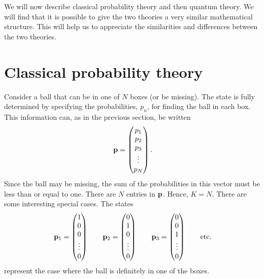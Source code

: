 \documentclass[12pt]{article}
\begin{document}
We will now describe classical probability theory and then quantum
theory.  We will find that it is possible to give the two theories a
very similar mathematical structure.  This will help us to appreciate the
similarities and differences between the two theories.

\section{Classical probability theory}

Consider a ball that can be in one of $N$ boxes (or be missing).  The
state is fully determined by specifying the probabilities, $p_n$, for
finding the ball in each box.  This information can, as in the previous
section, be written
\begin{equation}
  {\bf p} = \left(
  \begin{matrix} p_1 \\ p_2 \\ p_3 \\ \vdots \\ p_N \end{matrix}
  \right).
\end{equation}
Since the ball may be missing, the sum of the probabilities in this
vector must be less than or equal to one.  There are $N$ entries in
${\bf p}$. Hence, $K=N$.  There are some interesting special cases.  The
states
\begin{equation}
{\bf p}_1= \left(
\begin{matrix} 1 \\ 0 \\ 0 \\ \vdots \\ 0 \end{matrix} \right) \qquad
{\bf p}_2= \left(
\begin{matrix} 0 \\ 1 \\ 0 \\ \vdots \\ 0 \end{matrix} \right) \qquad
{\bf p}_3= \left(
\begin{matrix} 0 \\ 0 \\ 1 \\ \vdots \\ 0 \end{matrix} \right) \qquad
{\rm etc.}
\end{equation}
represent the case where the ball is definitely in one of the boxes.
\end{document}
